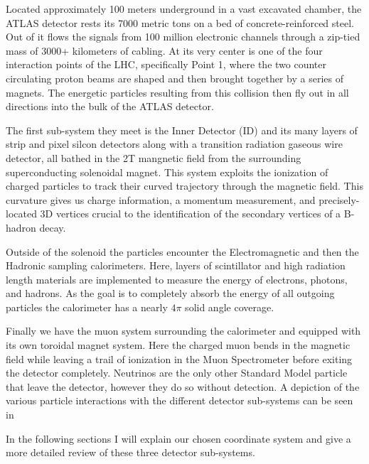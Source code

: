 Located approximately 100 meters underground in a vast excavated chamber, the
ATLAS detector rests its 7000 metric tons on a bed of concrete-reinforced
steel.  Out of it flows the signals from 100 million electronic channels
through a zip-tied mass of 3000+ kilometers of cabling.  At its very center is
one of the four interaction points of the LHC, specifically Point 1, where the
two counter circulating proton beams are shaped and then brought together by a
series of magnets.  The energetic particles resulting from this collision then
fly out in all directions into the bulk of the ATLAS detector.

The first sub-system they meet is the Inner Detector (ID) and its many layers of
strip and pixel silcon detectors along with a transition radiation gaseous wire
detector, all bathed in the 2T mangnetic field from the surrounding superconducting
solenoidal magnet.  This system exploits the ionization of charged particles to
track their curved trajectory through the magnetic field.  This curvature gives
us charge information, a momentum measurement, and precisely-located 3D vertices
crucial to the identification of the secondary vertices of a B-hadron decay. 

Outside of the solenoid the particles encounter the Electromagnetic and then
the Hadronic sampling calorimeters. Here, layers of scintillator and high
radiation length materials are implemented to measure the energy of electrons,
photons, and hadrons. As the goal is to completely absorb the energy of all
outgoing particles the calorimeter has a nearly $4\pi$ solid angle coverage.

Finally we have the muon system surrounding the calorimeter and equipped with
its own toroidal magnet system.  Here the charged muon bends in the magnetic
field while leaving a trail of ionization in the Muon Spectrometer before
exiting the detector completely.  Neutrinos are the only other Standard Model
particle that leave the detector, however they do so without detection.  A
depiction of the various particle interactions with the different detector
sub-systems can be seen in 

In the following sections I will explain our chosen coordinate system and give 
a more detailed review of these three detector sub-systems.


